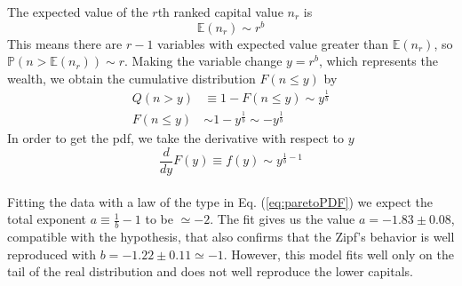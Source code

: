 The expected value of the $r$th ranked capital value $n_r$ is
\begin{equation*}
    \mathbb{E}(n_r)\sim r^b
\end{equation*}
This means there are $r - 1$ variables with expected value greater than $\mathbb{E}(n_r)$, so $\mathbb{P}(n > \mathbb{E}(n_r)) \sim r$.
Making the variable change $y=r^b$, which represents the wealth, we obtain the cumulative distribution $F(n \leq y)$ by
\begin{equation*}
    \begin{split}
        Q(n > y) &\equiv 1 - F(n \leq y) \sim y^{\frac{1}{b}} \\
        F(n \leq y) &\sim 1 - y^{\frac{1}{b}} \sim -y^{\frac{1}{b}}
    \end{split}
\end{equation*}
In order to get the pdf, we take the derivative with respect to $y$
\begin{equation}
    \frac{d}{dy}F(y) \equiv f(y) \sim y^{\frac{1}{b} - 1}
    \label{eq:paretoPDF}
\end{equation}
\\Fitting the data with a law of the type in Eq. (\ref{eq:paretoPDF}) we expect the total exponent $a \equiv \frac{1}{b} - 1$ to be $\simeq -2$.
The fit gives us the value $a = -1.83 \pm 0.08$, compatible with the hypothesis, that also confirms that the Zipf's behavior is well reproduced with $b = -1.22 \pm 0.11 \simeq -1$.
However, this model fits well only on the tail of the real distribution and does not well reproduce the lower capitals.
